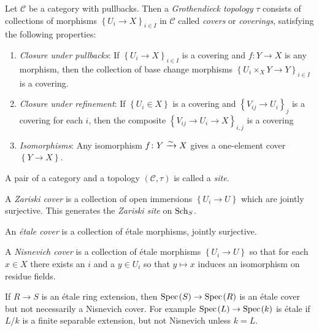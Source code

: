 \documentclass[11pt,openany]{book}
\begin{document}
\begin{definition} Let $\mathscr{C}$ be a category with pullbacks. Then a \textit{Grothendieck topology} $\tau$ consists of collections of morphisms $\left\{ U_i \to X \right\}_{i\in I}$ in $\mathscr{C}$ called \textit{covers} or \textit{coverings}, satisfying the following properties:
\begin{enumerate}
    \item \textit{Closure under pullbacks}: If $\left\{ U_i \to X \right\}_{i\in I}$ is a covering and $f \colon Y \to X$ is any morphism, then the collection of base change morphisms $\left\{ U_i \times_X Y \to Y \right\}_{i\in I}$ is a covering.
    \item \textit{Closure under refinement}: If $\left\{ U_i \in X \right\}$ is a covering and $\left\{ V_{ij} \to U_i \right\}_j$ is a covering for each $i$, then the composite $\left\{ V_{ij} \to U_i \to X \right\}_{i,j}$ is a covering
    \item \textit{Isomorphisms}: Any isomorphism $f\colon Y \xrightarrow{\sim} X$ gives a one-element cover $\left\{ Y \to X \right\}$.
\end{enumerate}
A pair of a category and a topology $(\mathscr{C},\tau)$ is called a \textit{site}.
\end{definition}

\begin{example} A \textit{Zariski cover} is a collection of open immersions $\left\{ U_i \to U \right\}$ which are jointly surjective. This generates the \textit{Zariski site} on $\mathrm{Sch}_S$.
\end{example}

\begin{example} An \textit{\'etale cover} is a collection of \'etale morphisms, jointly surjective.
\end{example}

\begin{example} A \textit{Nisnevich cover} is a collection of \'etale morphisms $\left\{ U_i \to U \right\}$ so that for each $x\in X$ there exists an $i$ and a $y\in U_i$ so that $y\mapsto x$ induces an isomorphism on residue fields.
\end{example}

\begin{note} If $R\to S$ is an \'etale ring extension, then $\text{Spec}\hspace{0.1em}(S) \to \text{Spec}\hspace{0.1em}(R)$ is an \'etale cover but not necessarily a Nisnevich cover. For example $\text{Spec}\hspace{0.1em}(L) \to \text{Spec}\hspace{0.1em}(k)$ is \'etale if $L/k$ is a finite separable extension, but not Nisnevich unless $k=L$.
\end{note}
\end{document}
